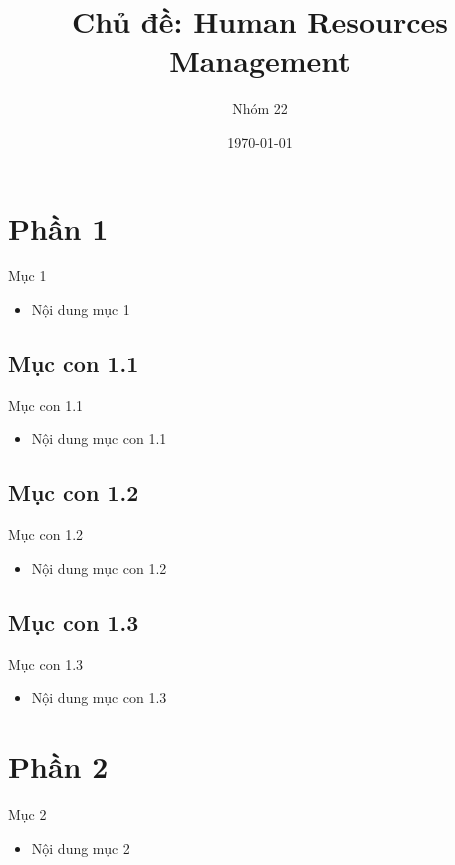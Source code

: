 \documentclass{beamer}
\title[{\makebox[.15\paperwidth]{Human Resources Management}}]{Chủ đề: Human Resources Management}
\author[Nhóm 22]{Nhóm 22      
}
\date{\today}
\begin{document}

\frame{\titlepage}

\frame{\tableofcontents}

\section{Phần 1}
\begin{frame}{Mục 1}
    \begin{itemize}
        \item Nội dung mục 1
    \end{itemize}
\end{frame}

\subsection{Mục con 1.1}
\begin{frame}{Mục con 1.1}
    \begin{itemize}
        \item Nội dung mục con 1.1
    \end{itemize}
\end{frame}

\subsection{Mục con 1.2}
\begin{frame}{Mục con 1.2}
    \begin{itemize}
        \item Nội dung mục con 1.2
    \end{itemize}
\end{frame}

\subsection{Mục con 1.3}
\begin{frame}{Mục con 1.3}
    \begin{itemize}
        \item Nội dung mục con 1.3
    \end{itemize}
\end{frame}

\section{Phần 2}
\begin{frame}{Mục 2}
    \begin{itemize}
        \item Nội dung mục 2
    \end{itemize}
\end{frame}
\end{document}
